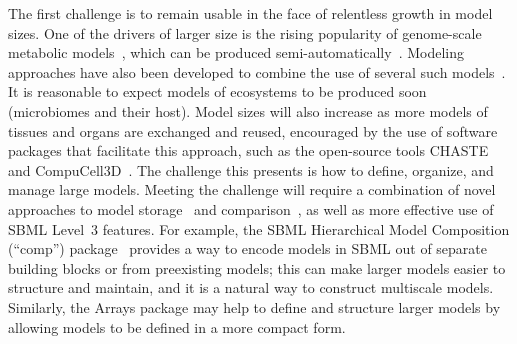 \documentclass{sbml-paper}
\begin{document}
The first challenge is to remain usable in the face of relentless growth in model sizes.  One of the drivers of larger size is the rising popularity of genome-scale metabolic models~\citep{Bordbar2014a}, which can be produced semi-automatically~\citep{henry2010high}.  Modeling approaches have also been developed to combine the use of several such models~\citep[e.g.,][]{bordbar2011multi}.  It is reasonable to expect models of ecosystems to be produced soon (\eg microbiomes and their host).  Model sizes will also increase as more models of tissues and organs are exchanged and reused, encouraged by the use of software packages that facilitate this approach, such as the open-source tools CHASTE~\citep{mirams2013chaste} and CompuCell3D~\citep{swat2012multi}.  The challenge this presents is how to define, organize, and manage large models.  Meeting the challenge will require a combination of novel approaches to model storage~\citep[e.g.,][]{Henkel2015combininga} and comparison~\citep[e.g.,][]{Scharm2016algorithm, Scharm2016comodi}, as well as more effective use of SBML Level~3 features.  For example, the SBML Hierarchical Model Composition (``comp'') package~\citep{Smith2015} provides a way to encode models in SBML out of separate building blocks or from preexisting models; this can make larger models easier to structure and maintain, and it is a natural way to construct multiscale models.  Similarly, the Arrays package may help to define and structure larger models by allowing models to be defined in a more compact form. %
\end{document}
